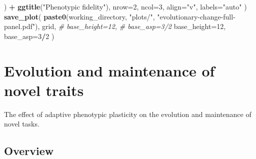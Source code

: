 \documentclass[]{book}
\newenvironment{Shaded}{\begin{snugshade}}{\end{snugshade}}
\newcommand{\CommentTok}[1]{\textcolor[rgb]{0.56,0.35,0.01}{\textit{#1}}}
\newcommand{\DataTypeTok}[1]{\textcolor[rgb]{0.13,0.29,0.53}{#1}}
\newcommand{\DecValTok}[1]{\textcolor[rgb]{0.00,0.00,0.81}{#1}}
\newcommand{\KeywordTok}[1]{\textcolor[rgb]{0.13,0.29,0.53}{\textbf{#1}}}
\newcommand{\NormalTok}[1]{#1}
\newcommand{\OperatorTok}[1]{\textcolor[rgb]{0.81,0.36,0.00}{\textbf{#1}}}
\newcommand{\StringTok}[1]{\textcolor[rgb]{0.31,0.60,0.02}{#1}}
\begin{document}
\begin{Shaded}
\begin{Highlighting}[]
\NormalTok{    ) }\OperatorTok{+}
\StringTok{    }\KeywordTok{ggtitle}\NormalTok{(}\StringTok{"Phenotypic fidelity"}\NormalTok{),}
  \DataTypeTok{nrow=}\DecValTok{2}\NormalTok{,}
  \DataTypeTok{ncol=}\DecValTok{3}\NormalTok{,}
  \DataTypeTok{align=}\StringTok{"v"}\NormalTok{,}
  \DataTypeTok{labels=}\StringTok{"auto"}
\NormalTok{)}
\KeywordTok{save_plot}\NormalTok{(}
  \KeywordTok{paste0}\NormalTok{(working_directory, }\StringTok{"plots/"}\NormalTok{, }\StringTok{"evolutionary-change-full-panel.pdf"}\NormalTok{),}
\NormalTok{  grid,}
  \CommentTok{#  base_height=12,}
  \CommentTok{#  base_asp=3/2}
  \DataTypeTok{base_height=}\DecValTok{12}\NormalTok{,}
  \DataTypeTok{base_asp=}\DecValTok{3}\OperatorTok{/}\DecValTok{2}
\NormalTok{)}
\end{Highlighting}
\end{Shaded}

\hypertarget{evolution-and-maintenance-of-novel-traits}{%
\chapter{Evolution and maintenance of novel traits}\label{evolution-and-maintenance-of-novel-traits}}

The effect of adaptive phenotypic plasticity on the evolution and maintenance of novel tasks.

\hypertarget{overview-2}{%
\section{Overview}\label{overview-2}}
\end{document}
